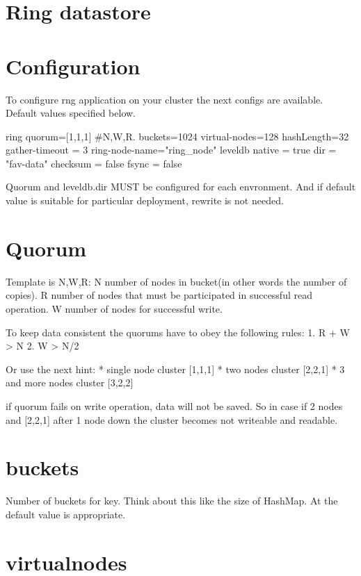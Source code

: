 \section*{Ring datastore}

\section*{Configuration}
To configure rng application on your cluster the next configs are available. Default values specified below.

\begin{json}
ring{
  quorum=[1,1,1]  #N,W,R.
  buckets=1024
  virtual-nodes=128
  hashLength=32
  gather-timeout = 3
  ring-node-name="ring_node"
  leveldb {
    native = true
    dir = "fav-data"
    checksum = false
    fsync = false
  }
}
\end{json}

Quorum and leveldb.dir MUST be configured for each envronment.
And if default value is suitable for particular deployment, rewrite is not needed.

\section*{Quorum}

Template is N,W,R:
N \- number of nodes in bucket(in other words the number of copies).
R \- number of nodes that must  be participated in successful read operation.
W \- number of nodes for successful write.

To keep data consistent the quorums have to obey the following rules:
1. R + W > N
2. W > N/2

Or use the next hint:
* single node cluster [1,1,1]
* two nodes cluster [2,2,1]
* 3 and more nodes cluster [3,2,2]


if quorum fails on write operation, data will not be saved. So in case if 2 nodes and [2,2,1] after 1 node down
the cluster becomes not writeable and readable.

\section*{buckets}

Number of buckets for key. Think about this like the size of HashMap. At the default value is appropriate.

\section*{virtual\-nodes}

